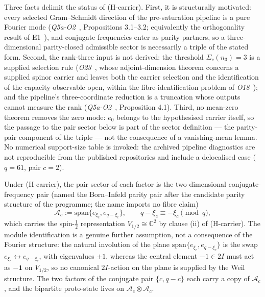 \documentclass[11pt]{article}
\begin{document}
    Three facts delimit the status of (H-carrier).
    First, it is structurally motivated: every selected Gram--Schmidt direction of the
    pre-saturation pipeline is a pure Fourier mode (\emph{Q5a-O2}~\cite{Beau2026q5ao2},
    Propositions 3.1--3.2; equivalently the orthogonality result of
    E1~\cite{Beau2026ent1}), and conjugate frequencies enter as parity partners, so a
    three-dimensional parity-closed admissible sector is necessarily a triple of the stated
    form.
    Second, the rank-three input is not derived: the threshold $\Sigma_c(n_3)=3$ is a supplied
    selection rule (\emph{O23}~\cite{Beau2026a27}, whose adjoint-dimension theorem concerns a
    supplied spinor carrier and leaves both the carrier selection and the identification of the
    capacity observable open, within the fibre-identification problem of
    \emph{O18}~\cite{Beau2026a22}); and the pipeline's three-coordinate reduction is a
    truncation whose outputs cannot measure the rank
    (\emph{Q5a-O2}~\cite{Beau2026q5ao2}, Proposition 4.1).
    Third, no mean-zero theorem removes the zero mode: $e_0$ belongs to the hypothesised
    carrier itself, so the passage to the pair sector below is part of the sector definition
    --- the parity-pair component of the triple --- not the consequence of a vanishing-mean
    lemma.
    No numerical support-size table is invoked: the archived pipeline diagnostics are not
    reproducible from the published repositories and include a delocalised case
    ($q=61$, pair $c=2$).

    Under (H-carrier), the pair sector of each factor is the two-dimensional
    conjugate-frequency pair (named the Born--Infeld parity pair after the candidate parity
    structure of the programme; the name imports no fibre claim)
    \[
      \mathcal{A}_c
      := \mathrm{span}\{e_{\xi_c}, e_{q-\xi_c}\},
      \qquad
      q-\xi_c \equiv -\xi_c \pmod q,
    \]
    which carries the spin-$\tfrac12$ representation $V_{1/2}\cong\mathbb{C}^2$ by clause
    (ii) of (H-carrier).
    The module identification is a genuine further assumption, not a consequence of the
    Fourier structure: the natural involution of the plane
    $\mathrm{span}\{e_{\xi_c}, e_{q-\xi_c}\}$ is the swap $e_{\xi_c} \leftrightarrow
    e_{q-\xi_c}$, with eigenvalues $\pm 1$, whereas the central element $-1 \in 2I$ must
    act as $-\mathbf{1}$ on $V_{1/2}$, so no canonical $2I$-action on the plane is supplied
    by the Weil structure.
    The two factors of the conjugate pair $\{c,q-c\}$ each carry a copy of $\mathcal{A}_c$,
    and the bipartite proto-state lives on $\mathcal{A}_c\otimes\mathcal{A}_c$.
\end{document}
